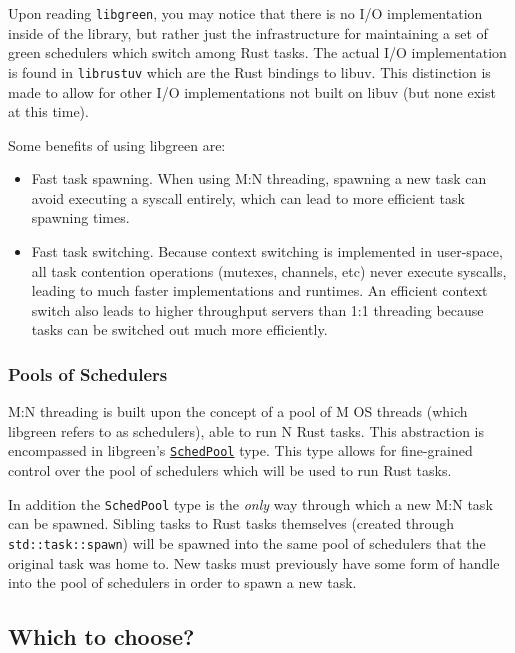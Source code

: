 \documentclass[]{article}
\begin{document}
Upon reading \texttt{libgreen}, you may notice that there is no I/O
implementation inside of the library, but rather just the infrastructure
for maintaining a set of green schedulers which switch among Rust tasks.
The actual I/O implementation is found in \texttt{librustuv} which are
the Rust bindings to libuv. This distinction is made to allow for other
I/O implementations not built on libuv (but none exist at this time).

Some benefits of using libgreen are:

\begin{itemize}
\itemsep1pt\parskip0pt
\item
  Fast task spawning. When using M:N threading, spawning a new task can
  avoid executing a syscall entirely, which can lead to more efficient
  task spawning times.
\item
  Fast task switching. Because context switching is implemented in
  user-space, all task contention operations (mutexes, channels, etc)
  never execute syscalls, leading to much faster implementations and
  runtimes. An efficient context switch also leads to higher throughput
  servers than 1:1 threading because tasks can be switched out much more
  efficiently.
\end{itemize}

\subsubsection{Pools of Schedulers}\label{pools-of-schedulers}

M:N threading is built upon the concept of a pool of M OS threads (which
libgreen refers to as schedulers), able to run N Rust tasks. This
abstraction is encompassed in libgreen's
\href{green/struct.SchedPool.html}{\texttt{SchedPool}} type. This type
allows for fine-grained control over the pool of schedulers which will
be used to run Rust tasks.

In addition the \texttt{SchedPool} type is the \emph{only} way through
which a new M:N task can be spawned. Sibling tasks to Rust tasks
themselves (created through \texttt{std::task::spawn}) will be spawned
into the same pool of schedulers that the original task was home to. New
tasks must previously have some form of handle into the pool of
schedulers in order to spawn a new task.

\subsection{Which to choose?}\label{which-to-choose}
\end{document}
